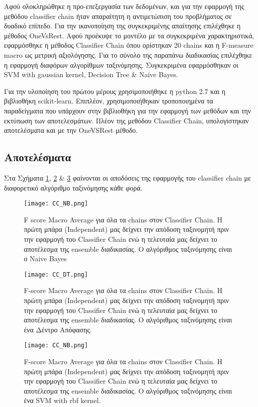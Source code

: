 Αφού ολοκληρώθηκε η προ-επεξεργασία των δεδομένων, και για την εφαρμογή της μεθόδου classifier chain ήταν απαραίτητη η αντιμετώπιση του προβλήματος σε δυαδικό επίπεδο. Για την ικανοποίηση της συγκεκριμένης απαίτησης επιλέχθηκε η μέθοδος OneVsRest. Αφού προέκυψε το μοντέλο με τα συγκεκριμένα χαρακτηριστικά, εφαρμόσθηκε η μέθοδος Classifier Chain όπου ορίστηκαν 20 chains και η F-measure macro ως μετρική αξιολόγησης. Για το σύνολο της παραπάνω διαδικασίας επιλέχθηκε η εφαρμογή διαφόρων αλγορίθμων ταξινόμησης. Συγκεκριμένα εφαρμόσθηκαν οι SVM with gaussian kernel, Decision Tree \& Naive Bayes.

Για την υλοποίηση του πρώτου μέρους χρησιμοποιήθηκε η python 2.7 και η βιβλιοθήκη scikit-learn. Επιπλέον, χρησιμοποιήθηκαν τροποποιημένα τα παραδείγματα που υπάρχουν στην βιβλιοθήκη για την εφαρμογή των μεθόδων και την εκτύπωση των αποτελεσμάτων.
Πλέον της μεθόδου Classifier Chain, υπολογίστηκαν αποτελέσματα και με την OneVSRest μέθοδο.

\subsection{Αποτελέσματα}

Στα Σχήματα \ref{fig: CC_NB}, \ref{fig: CC_DT} \& \ref{fig: CC_SVM} φαίνονται οι αποδόσεις της εφαρμογής του classifier chain με διαφορετικό αλγόριθμο ταξινόμησης κάθε φορά.



\begin{figure}
	\texttt{[image: CC\_NB.png]}
	\caption{F score Macro Average για όλα τα chains στον Classifier Chain. Η πρώτη μπάρα (Independent) μας δείχνει την απόδοση ταξινομητή πριν την εφαρμογή του Classifier Chain ενώ η τελευταία μας δείχνει το αποτέλεσμα της ensemble διαδικασίας. Ο αλγόριθμος ταξινόμησης είναι ο Naive Bayes}
	\label{fig: CC_NB}
\end{figure}

\begin{figure}
	\texttt{[image: CC\_DT.png]}
	\caption{F-score Macro Average για όλα τα chains στον Classifier Chain. Η πρώτη μπάρα (Independent) μας δείχνει την απόδοση ταξινομητή πριν την εφαρμογή του Classifier Chain ενώ η τελευταία μας δείχνει το αποτέλεσμα της ensemble διαδικασίας. Ο αλγόριθμος ταξινόμησης είναι ένα Δέντρο Απόφασης.}
	\label{fig: CC_DT}
\end{figure}

\begin{figure}
	\texttt{[image: CC\_NB.png]}
	\caption{F-score Macro Average για όλα τα chains στον Classifier Chain. Η πρώτη μπάρα (Independent) μας δείχνει την απόδοση ταξινομητή πριν την εφαρμογή του Classifier Chain ενώ η τελευταία μας δείχνει το αποτέλεσμα της ensemble διαδικασίας. Ο αλγόριθμος ταξινόμησης είναι ένα SVM with rbf kernel.}
	\label{fig: CC_SVM}
\end{figure}


